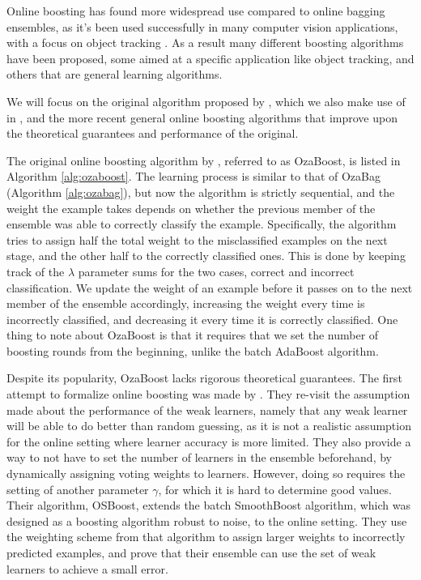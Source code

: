 Online boosting has found more widespread use compared to online bagging ensembles,
as it's been used successfully in many computer vision applications, with a focus on
object tracking \cite{online-boost-cv4, online-boost-cv, online-boost-cv3, online-boost-cv2, online-boost-cv5, online-boost-cv-6, online-boost-cv-7}.
As a result many different boosting algorithms have been proposed, some aimed at a specific application like object tracking, and others that are general learning algorithms.

We will focus on the original algorithm proposed by \citeauthor{Oza2001online},
which we also make use of in \boostvht,
and the more recent general online boosting algorithms that improve upon the
theoretical guarantees and performance of the original.

The original online boosting algorithm by \citeauthor{Oza2001online}, referred to as
OzaBoost, is listed
in Algorithm \ref{alg:ozaboost}.
The learning process is similar to that of OzaBag (Algorithm \ref{alg:ozabag}), but now the
algorithm is strictly sequential, and the weight the example takes depends on whether
the previous member of the ensemble was able to correctly classify the example.
Specifically, the algorithm tries to assign half the total weight to the misclassified
examples on the next stage, and the other half to the correctly classified ones.
This is done by keeping track of the $\lambda$ parameter sums for the two cases,
correct and incorrect classification. We update the weight of an example
before it passes on to the next member of the ensemble accordingly, increasing
the weight every time is incorrectly classified, and decreasing it every time it
is correctly classified.  One thing to note about OzaBoost is that it requires
that we set the number of boosting rounds from the beginning, unlike the
batch AdaBoost algorithm.

Despite its popularity, OzaBoost lacks rigorous theoretical guarantees.
The first attempt to formalize online boosting was made by \citet{online-boosting-theoretical}.
They re-visit the assumption made about the performance of the weak
learners, namely that any weak learner will be able to
do better than random guessing, as it is not a realistic assumption
for the online setting where learner accuracy is more limited. They also
provide a way to not have to set the number of learners in the ensemble beforehand,
by dynamically assigning voting weights to learners.
However, doing so requires the setting of another parameter $\gamma$,
for which it is hard to determine good values.
Their algorithm, OSBoost,
extends the batch SmoothBoost \cite{smoothboost} algorithm, which
was designed as a boosting algorithm robust to noise, to the online
setting. They use the weighting scheme from that algorithm to assign
larger weights to incorrectly predicted examples, and prove that
their ensemble can use the set of weak learners to achieve a small
error.

